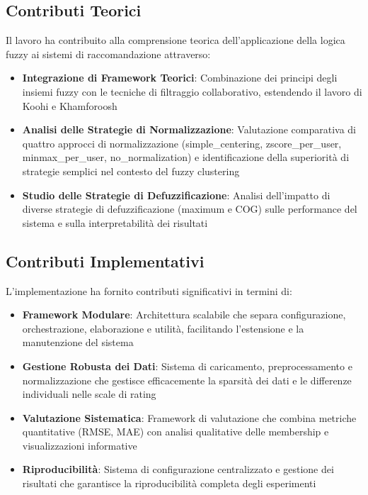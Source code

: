 \subsection{Contributi Teorici}

Il lavoro ha contribuito alla comprensione teorica dell'applicazione della logica fuzzy ai sistemi di raccomandazione attraverso:

\begin{itemize}
    \item \textbf{Integrazione di Framework Teorici}: Combinazione dei principi degli insiemi fuzzy con le tecniche di filtraggio collaborativo, estendendo il lavoro di Koohi e Khamforoosh~\cite{KOOHI2016134}
    
    \item \textbf{Analisi delle Strategie di Normalizzazione}: Valutazione comparativa di quattro approcci di normalizzazione (simple\_centering, zscore\_per\_user, minmax\_per\_user, no\_normalization) e identificazione della superiorità di strategie semplici nel contesto del fuzzy clustering
    
    \item \textbf{Studio delle Strategie di Defuzzificazione}: Analisi dell'impatto di diverse strategie di defuzzificazione (maximum e COG) sulle performance del sistema e sulla interpretabilità dei risultati
\end{itemize}

\subsection{Contributi Implementativi}

L'implementazione ha fornito contributi significativi in termini di:

\begin{itemize}
    \item \textbf{Framework Modulare}: Architettura scalabile che separa configurazione, orchestrazione, elaborazione e utilità, facilitando l'estensione e la manutenzione del sistema
    
    \item \textbf{Gestione Robusta dei Dati}: Sistema di caricamento, preprocessamento e normalizzazione che gestisce efficacemente la sparsità dei dati e le differenze individuali nelle scale di rating
    
    \item \textbf{Valutazione Sistematica}: Framework di valutazione che combina metriche quantitative (RMSE, MAE) con analisi qualitative delle membership e visualizzazioni informative
    
    \item \textbf{Riproducibilità}: Sistema di configurazione centralizzato e gestione dei risultati che garantisce la riproducibilità completa degli esperimenti
\end{itemize}

